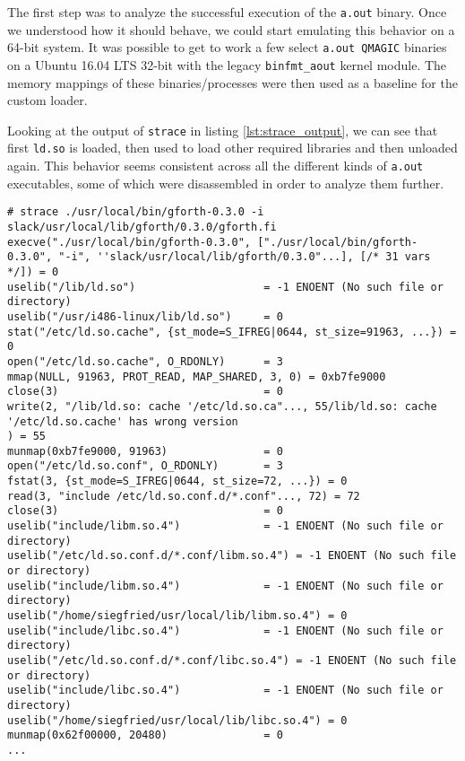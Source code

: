 \documentclass[draft,final]{vutinfth} %
\begin{document}
The first step was to analyze the successful execution of the \texttt{a.out} binary. Once we understood how it should behave, we could start emulating this behavior on a 64-bit system. It was possible to get to work a few select \texttt{a.out QMAGIC} binaries on a Ubuntu 16.04 LTS 32-bit with the legacy \texttt{binfmt\_aout} kernel module. The memory mappings of these binaries/processes were then used as a baseline for the custom loader.

Looking at the output of \texttt{strace} in listing \ref{lst:strace_output}, we can see that first \texttt{ld.so} is loaded, then used to load other required libraries and then unloaded again. This behavior seems consistent across all the different kinds of \texttt{a.out} executables, some of which were disassembled in order to analyze them further.

\begin{lstlisting}[caption={(Shortened) output of \texttt{strace} showing the system calls that are executed}, label={lst:strace_output}]
# strace ./usr/local/bin/gforth-0.3.0 -i slack/usr/local/lib/gforth/0.3.0/gforth.fi
execve("./usr/local/bin/gforth-0.3.0", ["./usr/local/bin/gforth-0.3.0", "-i", ''slack/usr/local/lib/gforth/0.3.0"...], [/* 31 vars */]) = 0
uselib("/lib/ld.so")                    = -1 ENOENT (No such file or directory)
uselib("/usr/i486-linux/lib/ld.so")     = 0
stat("/etc/ld.so.cache", {st_mode=S_IFREG|0644, st_size=91963, ...}) = 0
open("/etc/ld.so.cache", O_RDONLY)      = 3
mmap(NULL, 91963, PROT_READ, MAP_SHARED, 3, 0) = 0xb7fe9000
close(3)                                = 0
write(2, "/lib/ld.so: cache '/etc/ld.so.ca"..., 55/lib/ld.so: cache '/etc/ld.so.cache' has wrong version
) = 55
munmap(0xb7fe9000, 91963)               = 0
open("/etc/ld.so.conf", O_RDONLY)       = 3
fstat(3, {st_mode=S_IFREG|0644, st_size=72, ...}) = 0
read(3, "include /etc/ld.so.conf.d/*.conf"..., 72) = 72
close(3)                                = 0
uselib("include/libm.so.4")             = -1 ENOENT (No such file or directory)
uselib("/etc/ld.so.conf.d/*.conf/libm.so.4") = -1 ENOENT (No such file or directory)
uselib("include/libm.so.4")             = -1 ENOENT (No such file or directory)
uselib("/home/siegfried/usr/local/lib/libm.so.4") = 0
uselib("include/libc.so.4")             = -1 ENOENT (No such file or directory)
uselib("/etc/ld.so.conf.d/*.conf/libc.so.4") = -1 ENOENT (No such file or directory)
uselib("include/libc.so.4")             = -1 ENOENT (No such file or directory)
uselib("/home/siegfried/usr/local/lib/libc.so.4") = 0
munmap(0x62f00000, 20480)               = 0
...
\end{lstlisting}
\end{document}
